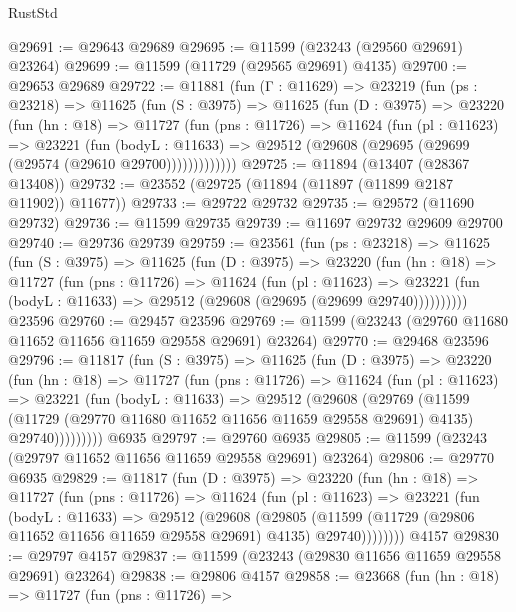 \begin{lexlean}{RustStd}
\begin{coremodule}
@29691 := @29643 @29689
@29695 := @11599 (@23243 (@29560 @29691) @23264)
@29699 := @11599 (@11729 (@29565 @29691) @4135)
@29700 := @29653 @29689
@29722 := @11881
    (fun (Γ : @11629) =>
    @23219
      (fun (ps : @23218) =>
      @11625
        (fun (S : @3975) =>
        @11625
          (fun (D : @3975) =>
          @23220
            (fun (hn : @18) =>
            @11727
              (fun (pns : @11726) =>
              @11624
                (fun (pl : @11623) =>
                @23221
                  (fun (bodyL : @11633) =>
                  @29512 (@29608 (@29695 (@29699 (@29574 (@29610 @29700)))))))))))))
@29725 := @11894 (@13407 (@28367 @13408))
@29732 := @23552 (@29725 (@11894 (@11897 (@11899 @2187 @11902)) @11677))
@29733 := @29722 @29732
@29735 := @29572 (@11690 @29732)
@29736 := @11599 @29735
@29739 := @11697 @29732 @29609 @29700
@29740 := @29736 @29739
@29759 := @23561
    (fun (ps : @23218) =>
    @11625
      (fun (S : @3975) =>
      @11625
        (fun (D : @3975) =>
        @23220
          (fun (hn : @18) =>
          @11727
            (fun (pns : @11726) =>
            @11624
              (fun (pl : @11623) =>
              @23221 (fun (bodyL : @11633) => @29512 (@29608 (@29695 (@29699 @29740))))))))))
    @23596
@29760 := @29457 @23596
@29769 := @11599 (@23243 (@29760 @11680 @11652 @11656 @11659 @29558 @29691) @23264)
@29770 := @29468 @23596
@29796 := @11817
    (fun (S : @3975) =>
    @11625
      (fun (D : @3975) =>
      @23220
        (fun (hn : @18) =>
        @11727
          (fun (pns : @11726) =>
          @11624
            (fun (pl : @11623) =>
            @23221
              (fun (bodyL : @11633) =>
              @29512
                (@29608
                  (@29769
                    (@11599
                      (@11729 (@29770 @11680 @11652 @11656 @11659 @29558 @29691) @4135)
                      @29740)))))))))
    @6935
@29797 := @29760 @6935
@29805 := @11599 (@23243 (@29797 @11652 @11656 @11659 @29558 @29691) @23264)
@29806 := @29770 @6935
@29829 := @11817
    (fun (D : @3975) =>
    @23220
      (fun (hn : @18) =>
      @11727
        (fun (pns : @11726) =>
        @11624
          (fun (pl : @11623) =>
          @23221
            (fun (bodyL : @11633) =>
            @29512
              (@29608
                (@29805
                  (@11599 (@11729 (@29806 @11652 @11656 @11659 @29558 @29691) @4135) @29740))))))))
    @4157
@29830 := @29797 @4157
@29837 := @11599 (@23243 (@29830 @11656 @11659 @29558 @29691) @23264)
@29838 := @29806 @4157
@29858 := @23668
    (fun (hn : @18) =>
    @11727
      (fun (pns : @11726) =>

\end{coremodule}
\end{lexlean}

